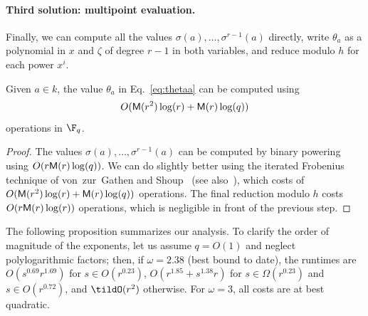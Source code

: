 \paragraph{\bf Third solution: multipoint evaluation.}
Finally, we can compute all the values
$\sigma(a),\dots,\sigma^{r-1}(a)$ directly, write $\theta_a$ as a
polynomial in $x$ and $\zeta$ of degree $r-1$ in both variables, and
reduce modulo $h$ for each power $x^i$.

\begin{proposition}
  \label{prop:iter-frob-theta}
  Given $a\in k$, the value $\theta_a$ in Eq.~\eqref{eq:thetaa} can
  be computed using 
  \[
O(\mathsf{M}(r^2)\log(r) + \mathsf{M}(r)\log(q))
\] operations in
  $\F_q$.
\end{proposition}
\begin{proof}
  The values $\sigma(a),\dots,\sigma^{r-1}(a)$ can be computed by
  binary powering using $O(r\mathsf{M}(r)\log(q))$. %
  We can do slightly better using the iterated Frobenius technique of
  von~zur~Gathen and Shoup~\cite[Algorithm~3.1]{vzgathen+shoup92:journal} (see
  also~\cite[Ch.~14.7]{vzGG}), which costs of
  $O(\mathsf{M}(r^2)\log(r) + \mathsf{M}(r)\log(q))$ operations. %
  The final reduction modulo $h$ costs $O(r\mathsf{M}(r)\log(r))$ operations,
  which is negligible in front of the previous step.
\end{proof}


The following proposition summarizes our analysis. To clarify the
order of magnitude of the exponents, let us assume $q=O(1)$ and
neglect polylogarithmic factors; then, if $\omega=2.38$ (best bound to
date), the runtimes are $O(s^{0.69}r^{1.69})$ for $s \in O(r^{0.23})$,
$O(r^{1.85}+s^{1.38}r)$ for $s \in \Omega(r^{0.23})$ and $s\in
O(r^{0.72})$, and $\tildO(r^2)$ otherwise.
For $\omega=3$, all costs are at best quadratic.

